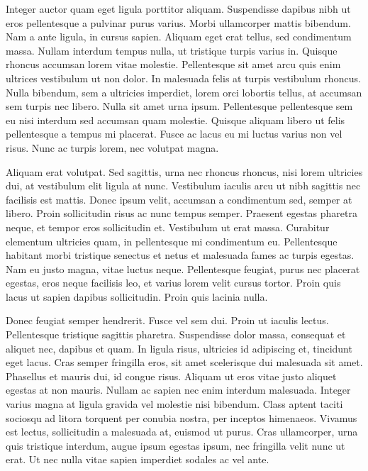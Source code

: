 Integer auctor quam eget ligula porttitor aliquam. Suspendisse dapibus nibh ut eros pellentesque a pulvinar purus varius. Morbi ullamcorper mattis bibendum. Nam a ante ligula, in cursus sapien. Aliquam eget erat tellus, sed condimentum massa. Nullam interdum tempus nulla, ut tristique turpis varius in. Quisque rhoncus accumsan lorem vitae molestie. Pellentesque sit amet arcu quis enim ultrices vestibulum ut non dolor. In malesuada felis at turpis vestibulum rhoncus. Nulla bibendum, sem a ultricies imperdiet, lorem orci lobortis tellus, at accumsan sem turpis nec libero. Nulla sit amet urna ipsum. Pellentesque pellentesque sem eu nisi interdum sed accumsan quam molestie. Quisque aliquam libero ut felis pellentesque a tempus mi placerat. Fusce ac lacus eu mi luctus varius non vel risus. Nunc ac turpis lorem, nec volutpat magna.

Aliquam erat volutpat. Sed sagittis, urna nec rhoncus rhoncus, nisi lorem ultricies dui, at vestibulum elit ligula at nunc. Vestibulum iaculis arcu ut nibh sagittis nec facilisis est mattis. Donec ipsum velit, accumsan a condimentum sed, semper at libero. Proin sollicitudin risus ac nunc tempus semper. Praesent egestas pharetra neque, et tempor eros sollicitudin et. Vestibulum ut erat massa. Curabitur elementum ultricies quam, in pellentesque mi condimentum eu. Pellentesque habitant morbi tristique senectus et netus et malesuada fames ac turpis egestas. Nam eu justo magna, vitae luctus neque. Pellentesque feugiat, purus nec placerat egestas, eros neque facilisis leo, et varius lorem velit cursus tortor. Proin quis lacus ut sapien dapibus sollicitudin. Proin quis lacinia nulla.

Donec feugiat semper hendrerit. Fusce vel sem dui. Proin ut iaculis lectus. Pellentesque tristique sagittis pharetra. Suspendisse dolor massa, consequat et aliquet nec, dapibus et quam. In ligula risus, ultricies id adipiscing et, tincidunt eget lacus. Cras semper fringilla eros, sit amet scelerisque dui malesuada sit amet. Phasellus et mauris dui, id congue risus. Aliquam ut eros vitae justo aliquet egestas at non mauris. Nullam ac sapien nec enim interdum malesuada. Integer varius magna at ligula gravida vel molestie nisi bibendum. Class aptent taciti sociosqu ad litora torquent per conubia nostra, per inceptos himenaeos. Vivamus est lectus, sollicitudin a malesuada at, euismod ut purus. Cras ullamcorper, urna quis tristique interdum, augue ipsum egestas ipsum, nec fringilla velit nunc ut erat. Ut nec nulla vitae sapien imperdiet sodales ac vel ante.

